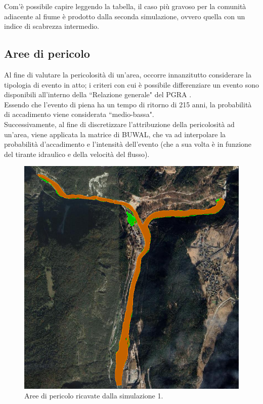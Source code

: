 Com'è possibile capire leggendo la tabella, il caso più gravoso per la comunità adiacente al fiume è prodotto dalla seconda simulazione, ovvero quella con un indice di scabrezza intermedio.

\subsection{Aree di pericolo}
Al fine di valutare la pericolosità di un'area, occorre innanzitutto considerare la tipologia di evento in atto; i criteri con cui è possibile differenziare un evento sono disponibili all'interno della ``Relazione generale" del PGRA \cite{rel_gen_pgra}.\\
Essendo che l'evento di piena ha un tempo di ritorno di 215 anni, la probabilità di accadimento viene considerata ``medio-bassa".\\
Successivamente, al fine di discretizzare l'attribuzione della pericolosità ad un'area, viene applicata la matrice di BUWAL, che va ad interpolare la probabilità d'accadimento e l'intensità dell'evento (che a sua volta è in funzione del tirante idraulico e della velocità del flusso).

\begin{figure}[htb] \centering
    \includegraphics[scale=0.5]{immagini/aree_pericolo_1.png}
    \caption{Aree di pericolo ricavate dalla simulazione 1.}
    \label{figure:aree_pericolo_1}
\end{figure}

